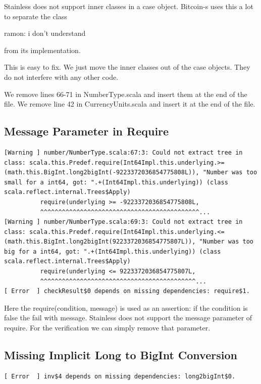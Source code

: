 \documentclass[runningheads]{llncs}
\newcommand{\todo}[1]{{\par \color{red}#1}}
\begin{document}
Stainless does not support inner classes in a case object. Bitcoin-s
uses this a lot to separate the class \todo{ramon: i don't understand} from its implementation.

This is easy to fix. We just move the inner classes out of the case objects. They do
not interfere with any other code.

We remove lines 66-71 in NumberType.scala and insert them at the end of the file.
We remove line 42 in CurrencyUnits.scala and insert it at the end of the file.


\subsection{Message Parameter in Require}

\begin{lstlisting}[style=stainless]
[Warning ] number/NumberType.scala:67:3: Could not extract tree in class: scala.this.Predef.require(Int64Impl.this.underlying.>=(math.this.BigInt.long2bigInt(-9223372036854775808L)), "Number was too small for a int64, got: ".+(Int64Impl.this.underlying)) (class scala.reflect.internal.Trees$Apply)
          require(underlying >= -9223372036854775808L,
          ^^^^^^^^^^^^^^^^^^^^^^^^^^^^^^^^^^^^^^^^^^^^...
[Warning ] number/NumberType.scala:69:3: Could not extract tree in class: scala.this.Predef.require(Int64Impl.this.underlying.<=(math.this.BigInt.long2bigInt(9223372036854775807L)), "Number was too big for a int64, got: ".+(Int64Impl.this.underlying)) (class scala.reflect.internal.Trees$Apply)
          require(underlying <= 9223372036854775807L,
          ^^^^^^^^^^^^^^^^^^^^^^^^^^^^^^^^^^^^^^^^^^^...
[ Error  ] checkResult$0 depends on missing dependencies: require$1.
\end{lstlisting}

Here the require(condition, message) is used as an assertion: if the
condition is false the fail with message.  Stainless does not support
the message parameter of require.  For the verification we can simply
remove that parameter.



\subsection{Missing Implicit Long to BigInt Conversion}

\begin{lstlisting}[style=stainless]
[ Error  ] inv$4 depends on missing dependencies: long2bigInt$0.
\end{lstlisting}
\end{document}
